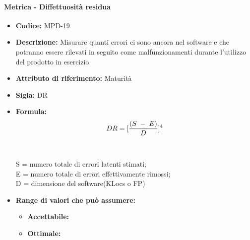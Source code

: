                   \paragraph{Metrica - Diffettuosità residua} 
            \begin{itemize}
           \item   \textbf{Codice:} MPD-19
           \item   \textbf{Descrizione:} Misurare quanti errori ci sono ancora nel software e che potranno essere rilevati in seguito come malfunzionamenti durante l'utilizzo del prodotto in esercizio 
           \item   \textbf{Attributo di riferimento:} Maturità
           \item   \textbf{Sigla:} DR
           \item   \textbf{Formula:} $$DR = {[{(S\; - \; E)\over D}]^4}$$\\ \\
            S = numero totale di errori latenti stimati;\\
            E = numero totale di errori effettivamente rimossi;\\
            D = dimensione del software(KLocs o FP)
            \item \textbf{Range di valori che può assumere:}
        \begin{itemize}
            \item \textbf{Accettabile:} 
            \item \textbf{Ottimale:} 
        \end{itemize}
       \end{itemize}
       
